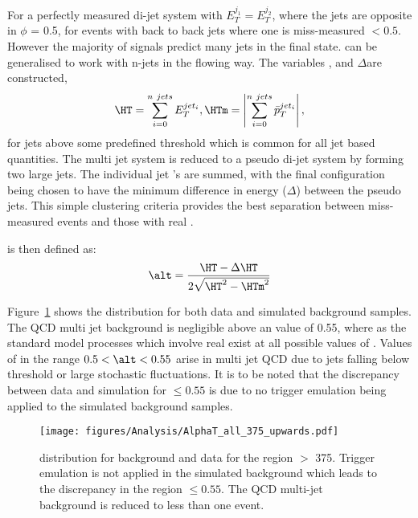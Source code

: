 For a perfectly measured di-jet system with $E_{T}^{j_{1}} = E_{T}^{j_{2}}$, 
where the jets are opposite in $\phi$ \alt = 0.5, for events with back to back 
jets where one is miss-measured \alt $ < 0.5$.
However the majority of signals predict many jets in the final state.
\alt can be generalised to work with n-jets in the flowing way.
The variables \HT, \HTm and $\Delta$\HT are constructed,
\begin{equation}
  \HT = \sum_{i = 0}^{n~jets}E_{T}^{jet_{i}}, \\
  \HTm = \left|\sum_{i = 0}^{n~jets}\bar{p}_{T}^{jet_{i}}\right|,
\end{equation}
for jets above some predefined threshold \ET which is common for all jet based 
quantities. The multi jet system is reduced to a pseudo di-jet system by 
forming two large jets. The individual jet \ET's are summed, with the final 
configuration being chosen to have the minimum difference in energy 
($\Delta$\HT) between the pseudo jets. This simple clustering criteria provides 
the best separation between miss-measured events and those with real \MET.

\alt is then defined as:
\begin{equation}
  \alt = \frac{\HT - \Delta\HT}{2\sqrt{\HT^{2}-\HTm^{2}}}
\end{equation}


Figure~\ref{fig:figures_Analysis_AlphaT_all_375_upwards} shows the \alt 
distribution for both data and simulated background samples. The QCD multi jet 
background is negligible above an \alt value of 0.55, where as the standard 
model processes which involve real \MET exist at all possible values of \alt.
Values of \alt in the range $0.5 < \alt < 0.55$ arise in multi jet QCD due to 
jets falling below threshold or large stochastic fluctuations.
It is to be noted that the discrepancy between data and simulation for \alt 
$\leq 0.55$ is due to no trigger emulation being applied to the simulated 
background samples.
\begin{figure}[ht|]
  \centering  \texttt{[image: figures/Analysis/AlphaT\_all\_375\_upwards.pdf]}
  \caption{\alt distribution for background and data for the region \HT $>$ 
  \unit{375}{\GeV}. Trigger emulation is not applied in the simulated 
  background which leads to the discrepancy in the region \alt $\leq 0.55$. The 
  QCD multi-jet background is reduced to less than one event.}
  \label{fig:figures_Analysis_AlphaT_all_375_upwards}
\end{figure}

